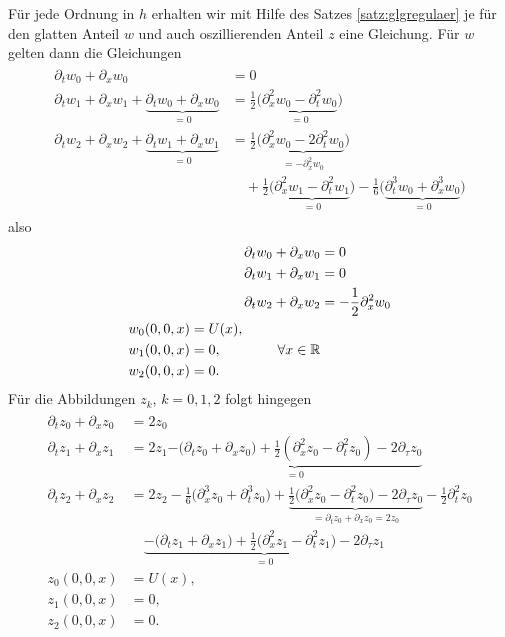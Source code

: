 Für jede Ordnung in $h$ erhalten wir mit Hilfe des Satzes \ref{satz:glgregulaer} je für den glatten Anteil $w$ und auch oszillierenden Anteil $z$ eine Gleichung.
Für $w$ gelten dann die Gleichungen
\begin{align}
\begin{split}
\partial_t w_0 + \partial_x w_0 &= 0\\ 
\partial_t w_1 + \partial_x w_1 + \underbrace{\partial_t w_0 + \partial_x w_0}_{= 0} &= \frac{1}{2} \bigl( \underbrace{ \partial^2_x w_0 - \partial^2_t w_0}_{= 0} \bigr)\\
\partial_t w_2 + \partial_x  w_2 + \underbrace{\partial_t w_1 + \partial_x w_1}_{= 0} &= \frac{1}{2} \bigl( \underbrace{\partial^2_x w_0 - 2 \partial^2_t w_0}_{= - \partial^2_x w_0} \bigr)\\
&\quad + \frac{1}{2} \bigl( \underbrace{\partial^2_x w_1 - \partial^2_t w_1}_{= 0} \bigr) - \frac{1}{6} \bigl( \underbrace{\partial^3_t w_0 +  \partial^3_x w_0}_{= 0} \bigr)
\end{split}
\end{align}
also
\begin{align}\label{eq:apx:fuerw}
\partial_t w_0 + \partial_x w_0 &= 0\\ 
\partial_t w_1 + \partial_x w_1 &= 0\\
\partial_t w_2 + \partial_x w_2 &= -\frac{1}{2} \partial^2_x w_0\\
\begin{split}
w_0(0, 0, x) &= U(x),\\
w_1(0, 0, x) &= 0, \qquad \qquad \forall x \in \mathbb R\\
w_2(0, 0, x) &= 0.
\end{split}
\end{align}
Für die Abbildungen $z_k$, $k = 0,1,2$ folgt hingegen
\begin{align}
\begin{split}
\partial_t z_0 + \partial_x z_0 &= 2 z_0\\ 
\partial_t z_1 + \partial_x z_1 &= 2 z_1 \underbrace{- \bigl( \partial_t z_0 + \partial_x z_0 \bigr) + \frac{1}{2} \left(\partial^2_x z_0 - \partial^2_t z_0\right) - 2 \partial_\tau z_0}_{= 0}\\
\partial_t z_2 + \partial_x z_2 &= 2 z_2 - \frac{1}{6} \bigl( \partial^3_x z_0 + \partial^3_t z_0 \bigr) + \underbrace{\frac{1}{2} \bigl(\partial^2_x z_0 - \partial^2_t z_0 \bigr) - 2 \partial_\tau z_0}_{= \partial_t z_0 + \partial_x z_0 = 2z_0} - \frac{1}{2} \partial^2_t z_0\\
&\quad \underbrace{ - \bigl(\partial_t z_1 +\partial_x z_1 \bigr) + \frac{1}{2}\bigl( \partial^2_x z_1 - \partial^2_t z_1 \bigr) - 2 \partial_\tau z_1}_{= 0}\\
z_0(0,0,x) &= U(x),\\
z_1(0,0,x) &= 0,\\
z_2(0,0,x) &= 0.
\end{split}
\end{align}

